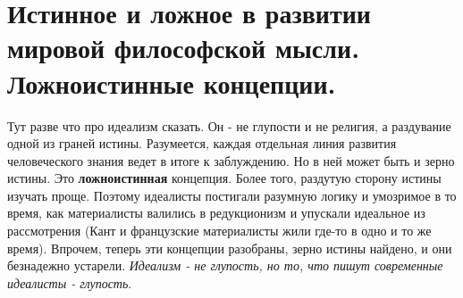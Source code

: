 \section{ Истинное и ложное в развитии мировой философской мысли. Ложноистинные концепции.}
Тут разве что про идеализм сказать. Он - не глупости и не религия, а раздувание одной из граней истины. Разумеется, каждая отдельная линия развития человеческого знания ведет в итоге к заблуждению. Но в ней может быть и зерно истины. Это \textbf{ложноистинная} концепция. Более того, раздутую сторону истины изучать проще. Поэтому идеалисты постигали разумную логику и умозримое в то время, как материалисты валились в редукционизм и упускали идеальное из рассмотрения (Кант и французские материалисты жили где-то в одно и то же время). Впрочем, теперь эти концепции разобраны, зерно истины найдено,  и они безнадежно устарели. \textit{Идеализм - не глупость, но то, что пишут современные идеалисты - глупость}.

 